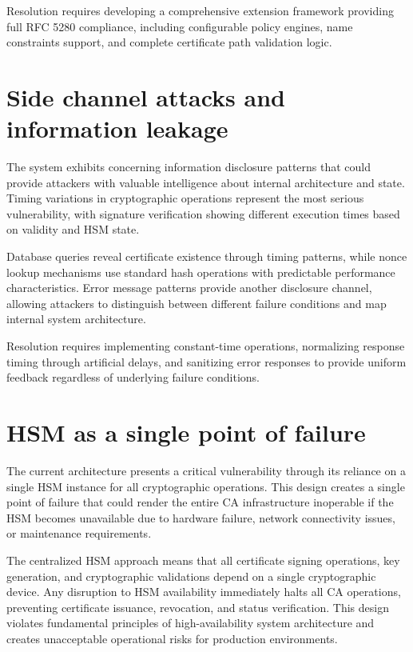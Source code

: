Resolution requires developing a comprehensive extension framework providing full RFC 5280 compliance, including configurable policy engines, name constraints support, and complete certificate path validation logic.


\section{Side channel attacks and information leakage}

The system exhibits concerning information disclosure patterns that could provide attackers with valuable intelligence about internal architecture and state. Timing variations in cryptographic operations represent the most serious vulnerability, with signature verification showing different execution times based on validity and HSM state.

Database queries reveal certificate existence through timing patterns, while nonce lookup mechanisms use standard hash operations with predictable performance characteristics. Error message patterns provide another disclosure channel, allowing attackers to distinguish between different failure conditions and map internal system architecture.

Resolution requires implementing constant-time operations, normalizing response timing through artificial delays, and sanitizing error responses to provide uniform feedback regardless of underlying failure conditions.


\section{HSM as a single point of failure}

The current architecture presents a critical vulnerability through its reliance on a single HSM instance for all cryptographic operations. This design creates a single point of failure that could render the entire CA infrastructure inoperable if the HSM becomes unavailable due to hardware failure, network connectivity issues, or maintenance requirements.

The centralized HSM approach means that all certificate signing operations, key generation, and cryptographic validations depend on a single cryptographic device. Any disruption to HSM availability immediately halts all CA operations, preventing certificate issuance, revocation, and status verification. This design violates fundamental principles of high-availability system architecture and creates unacceptable operational risks for production environments.

